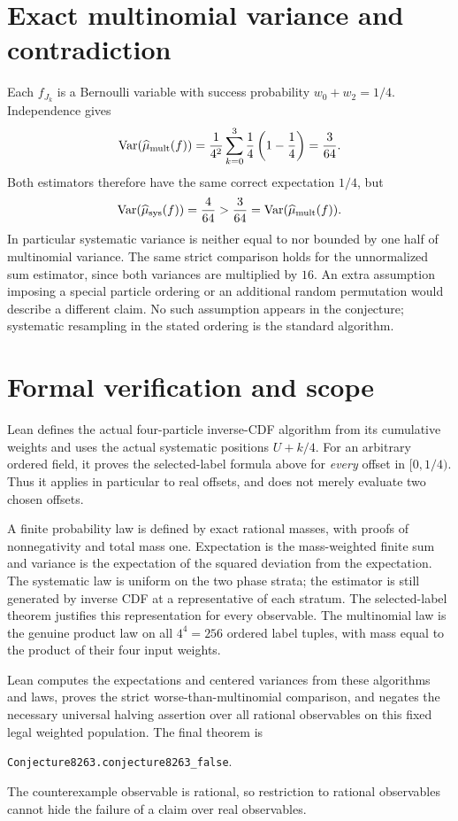 \documentclass[11pt]{article}
\begin{document}
\section*{Exact multinomial variance and contradiction}
Each $f_{J_k}$ is a Bernoulli variable with success probability
$w_0+w_2=1/4$. Independence gives
\[
 \operatorname{Var}(\widehat\mu_{\rm mult}(f))
 =\frac1{4^2}\sum_{k=0}^3\frac14\left(1-\frac14\right)
 =\frac3{64}.
\]
Both estimators therefore have the same correct expectation $1/4$, but
\[
 \operatorname{Var}(\widehat\mu_{\rm sys}(f))=\frac4{64}
 >\frac3{64}=\operatorname{Var}(\widehat\mu_{\rm mult}(f)).
\]
In particular systematic variance is neither equal to nor bounded by
one half of multinomial variance. The same strict comparison holds for
the unnormalized sum estimator, since both variances are multiplied by
$16$. An extra assumption imposing a special particle ordering or an
additional random permutation would describe a different claim. No such
assumption appears in the conjecture; systematic resampling in the stated
ordering is the standard algorithm.

\section*{Formal verification and scope}
Lean defines the actual four-particle inverse-CDF algorithm from its
cumulative weights and uses the actual systematic positions $U+k/4$.
For an arbitrary ordered field, it proves the selected-label formula
above for \emph{every} offset in $[0,1/4)$. Thus it applies in particular
to real offsets, and does not merely evaluate two chosen offsets.

A finite probability law is defined by exact rational masses, with
proofs of nonnegativity and total mass one. Expectation is the
mass-weighted finite sum and variance is the expectation of the squared
deviation from the expectation. The systematic law is uniform on the two
phase strata; the estimator is still generated by inverse CDF at a
representative of each stratum. The selected-label theorem justifies this
representation for every observable. The multinomial law is the genuine
product law on all $4^4=256$ ordered label tuples, with mass equal to the
product of their four input weights.

Lean computes the expectations and centered variances from these
algorithms and laws, proves the strict worse-than-multinomial comparison,
and negates the necessary universal halving assertion over all rational
observables on this fixed legal weighted population. The final theorem is
\begin{center}\texttt{Conjecture8263.conjecture8263\_false}.\end{center}
The counterexample observable is rational, so restriction to rational
observables cannot hide the failure of a claim over real observables.
\end{document}
